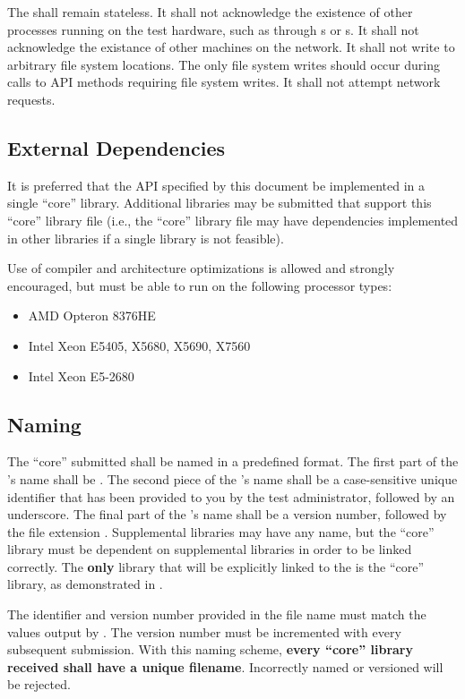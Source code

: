 The \lib shall remain stateless. It shall not acknowledge the existence of other
processes running on the test hardware, such as through s or
s. It shall not acknowledge the existance of other machines on the
network. It shall not write to arbitrary file system locations. The only file
system writes should occur during calls to API methods requiring file system
writes. It shall not attempt network requests.

\subsection{External Dependencies}
It is preferred that the API specified by this document be implemented in a
single ``core'' library. Additional libraries may be submitted that support this
``core'' library file (i.e., the ``core'' library file may have dependencies
implemented in other libraries if a single library is not feasible).

Use of compiler and architecture optimizations is allowed and strongly
encouraged, but \libs must be able to run on the following processor types:
\begin{itemize}
	\item AMD Opteron 8376HE
	\item Intel Xeon E5405, X5680, X5690, X7560
	\item Intel Xeon E5-2680
\end{itemize}

\subsection{Naming}
\label{subsec:software-naming}
The ``core'' \lib submitted shall be named in a predefined format. The first
part of the \lib's name shall be . The second piece of the \lib's
name shall be a case-sensitive unique identifier that has been provided to you
by the test administrator, followed by an underscore. The final part of the
\lib's name shall be a version number, followed by the file extension
. Supplemental libraries may have any name, but the ``core'' library
must be dependent on supplemental libraries in order to be linked correctly. The
\textbf{only} library that will be explicitly linked to the \testdriver is the
``core'' library, as demonstrated in .

The identifier and version number provided in the file name must match the
values output by . The version number must be incremented with
every subsequent submission. With this naming scheme, \textbf{every ``core''
library received shall have a unique filename}. Incorrectly named or versioned
\libs will be rejected.


